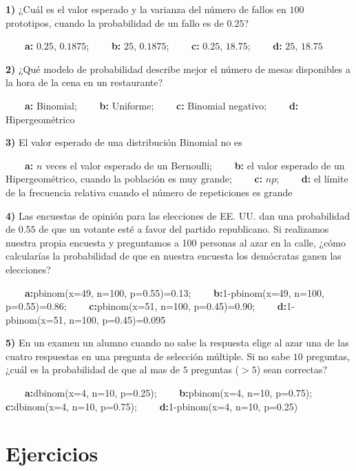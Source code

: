 \documentclass[
]{book}
\begin{document}
\textbf{1)} ¿Cuál es el valor esperado y la varianza del número de fallos en \(100\) prototipos, cuando la probabilidad de un fallo es de \(0.25\)?

\textbf{\(\qquad\)a:} \(0.25\), \(0.1875\);
\textbf{\(\qquad\)b:} \(25\), \(0.1875\);
\textbf{\(\qquad\)c:} \(0.25\), \(18.75\);
\textbf{\(\qquad\)d:} \(25\), \(18.75\)

\textbf{2)} ¿Qué modelo de probabilidad describe mejor el número de mesas disponibles a la hora de la cena en un restaurante?

\textbf{\(\qquad\)a:} Binomial;
\textbf{\(\qquad\)b:} Uniforme;
\textbf{\(\qquad\)c:} Binomial negativo;
\textbf{\(\qquad\)d:} Hipergeométrico

\textbf{3)} El valor esperado de una distribución Binomial no es

\textbf{\(\qquad\)a:} \(n\) veces el valor esperado de un Bernoulli;
\textbf{\(\qquad\)b:} el valor esperado de un Hipergeométrico, cuando la población es muy grande;
\textbf{\(\qquad\)c:} \(np\);
\textbf{\(\qquad\)d:} el límite de la frecuencia relativa cuando el número de repeticiones es grande

\textbf{4)} Las encuestas de opinión para las elecciones de EE. UU. dan una probabilidad de \(0.55\) de que un votante esté a favor del partido republicano. Si realizamos nuestra propia encuesta y preguntamos a 100 personas al azar en la calle, ¿cómo calcularías la probabilidad de que en nuestra encuesta los demócratas ganen las elecciones?

\textbf{\(\qquad\)a:}pbinom(x=49, n=100, p=0.55)=0.13;
\textbf{\(\qquad\)b:}1-pbinom(x=49, n=100, p=0.55)=0.86;
\textbf{\(\qquad\)c:}pbinom(x=51, n=100, p=0.45)=0.90; \textbf{\(\qquad\)d:}1-pbinom(x=51, n=100, p=0.45)=0.095

\textbf{5)} En un examen un alumno cuando no sabe la respuesta elige al azar una de las cuatro respuestas en una pregunta de selección múltiple. Si no sabe \(10\) preguntas, ¿cuál es la probabilidad de que al mas de \(5\) preguntas (\(>5\)) sean correctas?

\textbf{\(\qquad\)a:}dbinom(x=4, n=10, p=0.25); \textbf{\(\qquad\)b:}pbinom(x=4, n=10, p=0.75); \textbf{\(\qquad\)c:}dbinom(x=4, n=10, p=0.75); \textbf{\(\qquad\)d:}1-pbinom(x=4, n=10, p=0.25)

\hypertarget{ejercicios-5}{%
\section{Ejercicios}\label{ejercicios-5}}
\end{document}
